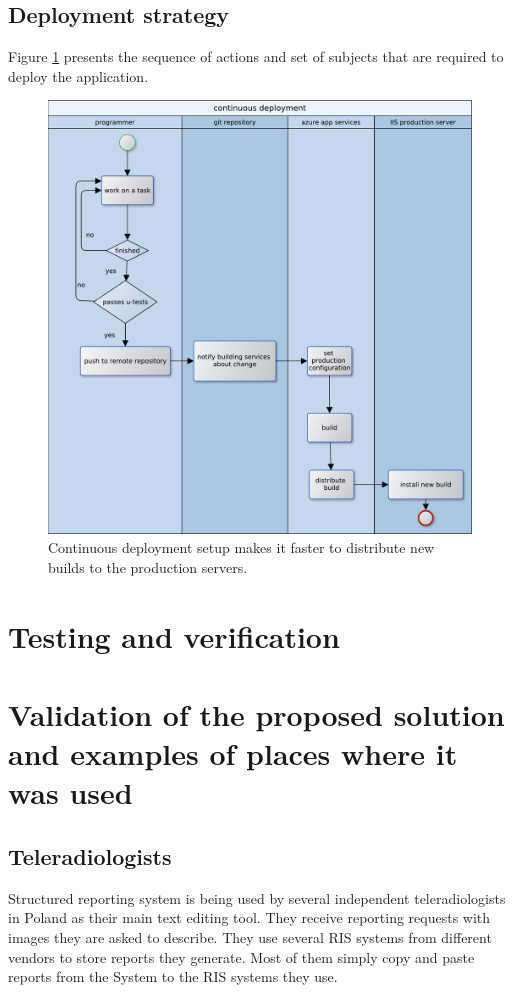 \documentclass[12pt, twoside, openany]{report}
\theoremstyle{definition}
\begin{document}
\section{Deployment strategy}

Figure \ref{fig:continuous-deployment} presents the sequence of actions and set of subjects that are required to deploy the application.
\begin{figure}
	\centering
	\includegraphics[width=\linewidth]{continuous-deployment}
	\caption{Continuous deployment setup makes it faster to distribute new builds to the production servers.
		\label{fig:continuous-deployment}
	}
\end{figure}

\chapter{Testing and verification}



\chapter{Validation of the proposed solution and examples of places where it was used}
\section{Teleradiologists}
Structured reporting system is being used by several independent teleradiologists in Poland as their main text editing tool. They receive reporting requests with images they are asked to describe. They use several RIS systems from different vendors to store reports they generate. Most of them simply copy and paste reports from the System to the RIS systems they use.
\end{document}
